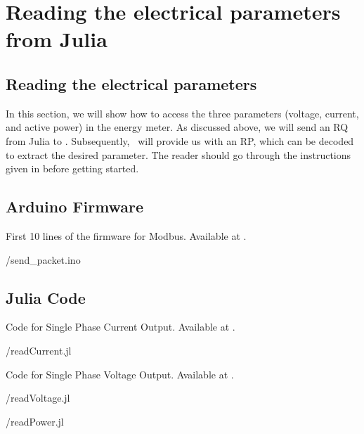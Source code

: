 \section{Reading the electrical parameters from Julia}
\subsection{Reading the electrical parameters}
In this section, we will show how to access the three parameters (voltage, current, and active power) in the energy meter. As discussed above, we will send an RQ from Julia to \arduino. Subsequently, \arduino\ will provide us with an RP, which can be decoded to extract the desired parameter. The reader should go through the instructions given in  before getting started. 

\subsection{Arduino Firmware}
\label{sec:firmware-modbus}
\begin{ardcode}
  {First 10 lines of the firmware for Modbus.  Available at
    .}
  \label{ard:firmware-modbus}
  
  {\LocMODardcode/send_packet.ino}
\end{ardcode}

\subsection{Julia Code}
\label{sec:modbus-julia-code}

\begin{juliacode}
  {Code for Single Phase Current Output.
    Available at .}
  \label{julia:current-modbus}
  
  {\LocMODjuliacode/readCurrent.jl}
\end{juliacode}

\begin{juliacode}
  {Code for Single Phase Voltage Output.
    Available at .}
  \label{julia:voltage-modbus}
  
  {\LocMODjuliacode/readVoltage.jl}
\end{juliacode}

\begin{juliacode}
  \label{julia:modbus-power}
  
  {\LocMODjuliacode/readPower.jl}
\end{juliacode}


